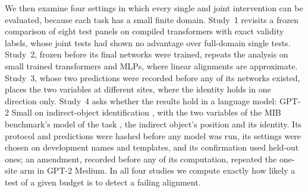 We then examine four settings in which every single and joint intervention can be evaluated, because each task has
a small finite domain. Study~1 revisits a frozen comparison of eight test panels on \CmpPrograms{} compiled
transformers with exact validity labels, whose joint tests had shown no advantage over full-domain single tests.
Study~2, frozen before its final networks were trained, repeats the analysis on \TrnNetworks{} small trained
transformers and MLPs, where linear alignments are approximate. Study~3, whose two predictions were recorded before
any of its networks existed, places the two variables at different sites, where the identity holds in one direction
only. Study~4 asks whether the results hold in a language model: GPT-2 Small on indirect-object identification
\citep{wang2023ioi}, with the two variables of the MIB benchmark's model of the task \citep{mueller2025mib}, the
indirect object's position and its identity. Its protocol and predictions were hashed before any model was run, its
settings were chosen on development names and templates, and its confirmation used held-out ones; an amendment,
recorded before any of its computation, repeated the one-site arm in GPT-2 Medium. In all four studies we compute
exactly how likely a test of a given budget is to detect a failing alignment.

